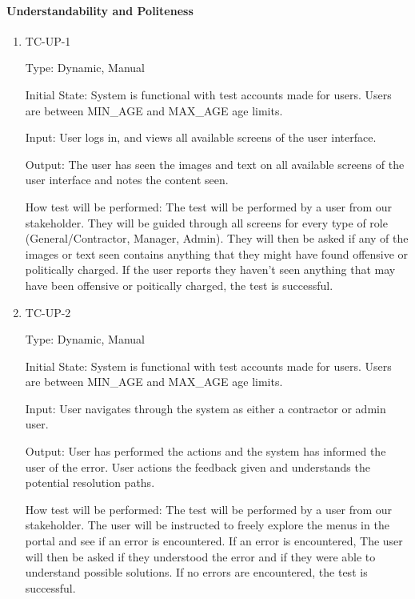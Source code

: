 \documentclass[12pt, titlepage]{article}
\begin{document}
\paragraph{Understandability and Politeness}
\begin{enumerate}
  \item{TC-UP-1\\}

    Type: Dynamic, Manual

    Initial State: System is functional with test accounts made for users. Users
    are between MIN\_AGE and MAX\_AGE age limits.

    Input: User logs in, and views all available screens of the user interface.

    Output: The user has seen the images and text on all available screens of
    the user interface and notes the content seen.

    How test will be performed: The test will be performed by a user from our
    stakeholder. They will be guided through all screens for every type of role
    (General/Contractor, Manager, Admin). They will then be asked if any of the
    images or text seen contains anything that they might have found offensive
    or politically charged. If the user reports they haven't seen anything that
    may have been offensive or poitically charged, the test is successful.

  \item{TC-UP-2\\}

    Type: Dynamic, Manual

    Initial State: System is functional with test accounts made for users. Users
    are between MIN\_AGE and MAX\_AGE age limits.

    Input: User navigates through the system as either a contractor or admin user.

    Output: User has performed the actions and the system has informed the user
    of the error. User actions the feedback given and understands the potential
    resolution paths.

    How test will be performed: The test will be performed by a user from our
    stakeholder. The user will be instructed to freely explore the menus in the portal and see if an error is encountered.
    If an error is encountered, The user will then be asked if they understood the error
    and if they were able to understand possible solutions.
    If no errors are encountered, the test is successful.

\end{enumerate}
\end{document}
